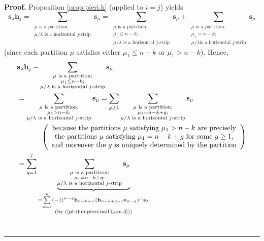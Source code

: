 \documentclass[numbers=enddot,12pt,final,onecolumn,notitlepage]{scrartcl}%
\theoremstyle{definition}
\newenvironment{proof}[1][Proof]{\noindent\textbf{#1.} }{\ \rule{0.5em}{0.5em}}
\let\sumnonlimits\sum
\renewcommand{\sum}{\sumnonlimits\limits}
\begin{document}
\begin{proof}
Proposition \ref{prop.pieri.h} (applied to $i=j$) yields%
\[
\mathbf{s}_{\lambda}\mathbf{h}_{j}=\sum_{\substack{\mu\text{ is a
partition;}\\\mu/\lambda\text{ is a horizontal }j\text{-strip}}}\mathbf{s}%
_{\mu}=\sum_{\substack{\mu\text{ is a partition;}\\\mu_{1}\leq n-k;\\\mu
/\lambda\text{ is a horizontal }j\text{-strip}}}\mathbf{s}_{\mu}%
+\sum_{\substack{\mu\text{ is a partition;}\\\mu_{1}>n-k;\\\mu/\lambda\text{
is a horizontal }j\text{-strip}}}\mathbf{s}_{\mu}%
\]
(since each partition $\mu$ satisfies either $\mu_{1}\leq n-k$ or $\mu
_{1}>n-k$). Hence,%
\begin{align}
&  \mathbf{s}_{\lambda}\mathbf{h}_{j}-\sum_{\substack{\mu\text{ is a
partition;}\\\mu_{1}\leq n-k;\\\mu/\lambda\text{ is a horizontal
}j\text{-strip}}}\mathbf{s}_{\mu}\nonumber\\
&  =\sum_{\substack{\mu\text{ is a partition;}\\\mu_{1}>n-k;\\\mu
/\lambda\text{ is a horizontal }j\text{-strip}}}\mathbf{s}_{\mu}=\sum_{g\geq
1}\sum_{\substack{\mu\text{ is a partition;}\\\mu_{1}=n-k+g;\\\mu
/\lambda\text{ is a horizontal }j\text{-strip}}}\mathbf{s}_{\mu}\nonumber\\
&  \ \ \ \ \ \ \ \ \ \ \left(
\begin{array}
[c]{c}%
\text{because the partitions }\mu\text{ satisfying }\mu_{1}>n-k\text{ are
precisely}\\
\text{the partitions }\mu\text{ satisfying }\mu_{1}=n-k+g\text{ for some
}g\geq1\text{,}\\
\text{and moreover the }g\text{ is uniquely determined by the partition}%
\end{array}
\right) \nonumber\\
&  =\sum_{g=1}^{j}\underbrace{\sum_{\substack{\mu\text{ is a partition;}%
\\\mu_{1}=n-k+g;\\\mu/\lambda\text{ is a horizontal }j\text{-strip}%
}}\mathbf{s}_{\mu}}_{\substack{=\sum_{w=1}^{n}\left(  -1\right)
^{w-g}\mathbf{h}_{n-k+w}\left(  \mathbf{h}_{n-k+g-j}\mathbf{e}_{w-g}\right)
^{\perp}\mathbf{s}_{\lambda}\\\text{(by (\ref{pf.thm.pieri-hall.Lam.3}))}%
}}
\end{align}
\end{proof}
\end{document}
